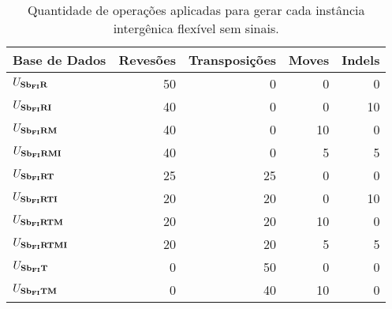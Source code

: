 \begin{table}[!htb]
  \caption{Quantidade de operações aplicadas para gerar cada instância intergênica flexível sem sinais.}
  \label{table:YUYKVZOZ}
  \centering
  \begin{tabular}{|p{3cm}|r|r|r|r|}
    \hline
    Base de Dados           & Revesões   & Transposições   & Moves   & Indels    \\ \hline
    $U_{\textbf{Sb\textsubscript{FI}R}}{}$            & 50         & 0               &  0      &  0       \\ \hline
    $U_{\textbf{Sb\textsubscript{FI}RI}}{}$           & 40         & 0               &  0      & 10       \\ \hline
    $U_{\textbf{Sb\textsubscript{FI}RM}}{}$           & 40         & 0               & 10      &  0       \\ \hline
    $U_{\textbf{Sb\textsubscript{FI}RMI}}{}$          & 40         & 0               &  5      &  5       \\ \hline
    $U_{\textbf{Sb\textsubscript{FI}RT}}{}$           & 25         & 25              &  0      &  0       \\ \hline
    $U_{\textbf{Sb\textsubscript{FI}RTI}}{}$          & 20         & 20              &  0      & 10       \\ \hline
    $U_{\textbf{Sb\textsubscript{FI}RTM}}{}$          & 20         & 20              & 10      &  0       \\ \hline
    $U_{\textbf{Sb\textsubscript{FI}RTMI}}{}$         & 20         & 20              &  5      &  5       \\ \hline
    $U_{\textbf{Sb\textsubscript{FI}T}}{}$            & 0          & 50              &  0      &  0       \\ \hline
    $U_{\textbf{Sb\textsubscript{FI}TM}}{}$           & 0          & 40              & 10      &  0       \\ \hline
  \end{tabular}
\end{table}